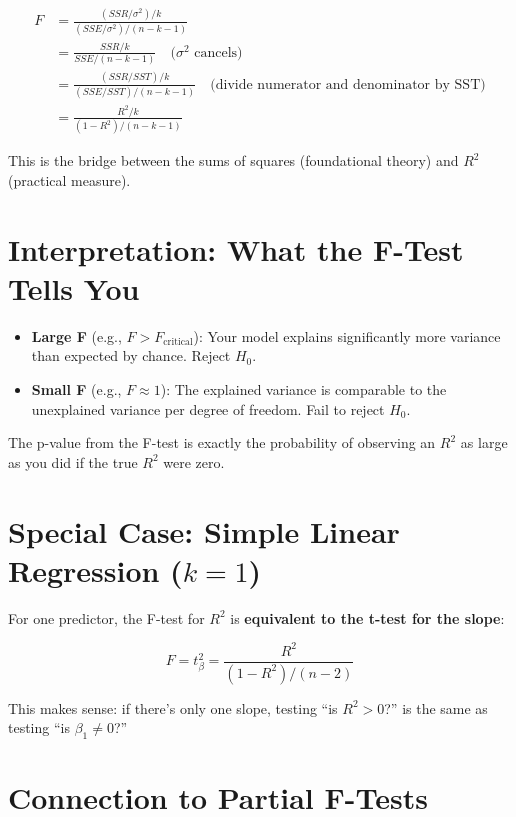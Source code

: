 \documentclass{article}
\begin{document}
\begin{align*}
    F &= \frac{(SSR/\sigma^2)/k}{(SSE/\sigma^2)/(n-k-1)} \\
      &= \frac{SSR/k}{SSE/(n-k-1)} \quad \text{($\sigma^2$ cancels)} \\
      &= \frac{(SSR/SST)/k}{(SSE/SST)/(n-k-1)} \quad \text{(divide numerator and denominator by SST)} \\
      &= \frac{R^2/k}{(1 - R^2)/(n - k - 1)}
\end{align*}

This is the bridge between the sums of squares (foundational theory) and $R^2$ (practical measure).

\section{Interpretation: What the F-Test Tells You}

\begin{itemize}
    \item \textbf{Large F} (e.g., $F > F_{\text{critical}}$): Your model explains significantly more variance than expected by chance. Reject $H_0$.
    \item \textbf{Small F} (e.g., $F \approx 1$): The explained variance is comparable to the unexplained variance per degree of freedom. Fail to reject $H_0$.
\end{itemize}

The p-value from the F-test is exactly the probability of observing an $R^2$ as large as you did if the true $R^2$ were zero.

\section{Special Case: Simple Linear Regression ($k = 1$)}

For one predictor, the F-test for $R^2$ is \textbf{equivalent to the t-test for the slope}:

\begin{equation}
    F = t_\beta^2 = \frac{R^2}{(1 - R^2)/(n - 2)}
\end{equation}

This makes sense: if there's only one slope, testing ``is $R^2 > 0$?'' is the same as testing ``is $\beta_1 \neq 0$?''

\section{Connection to Partial F-Tests}
\end{document}
